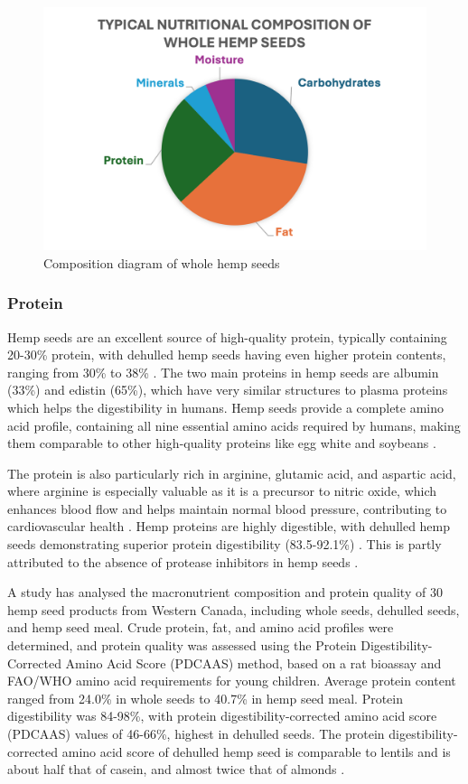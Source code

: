 \begin{figure}[H]
    \centering
    \includegraphics[width=0.73\linewidth]{Figures/fig_prod_concept_02.png}
    \caption{Composition diagram of whole hemp seeds}
    \label{fig:figure_05}
\end{figure}

\subsubsection{Protein}
Hemp seeds are an excellent source of high-quality protein, typically containing 20-30\% protein, with dehulled hemp seeds having even higher protein contents, ranging from 30\% to 38\% \cite*{HempBook}. The two main proteins in hemp seeds are albumin (33\%) and edistin (65\%), which have very similar structures to plasma proteins which helps the digestibility in humans. Hemp seeds provide a complete amino acid profile, containing all nine essential amino acids required by humans, making them comparable to other high-quality proteins like egg white and soybeans \cite*{HempBook}.

\vspace{1em}
The protein is also particularly rich in arginine, glutamic acid, and aspartic acid, where arginine is especially valuable as it is a precursor to nitric oxide, which enhances blood flow and helps maintain normal blood pressure, contributing to cardiovascular health \cite*{HempBook}.
Hemp proteins are highly digestible, with dehulled hemp seeds demonstrating superior protein digestibility (83.5-92.1\%) \cite*{montero2023hemp}. This is partly attributed to the absence of protease inhibitors in hemp seeds \cite*{aluko2017hemp}. 

\vspace{1em}
A study has analysed the macronutrient composition and protein quality of 30 hemp seed products from Western Canada, including whole seeds, dehulled seeds, and hemp seed meal. Crude protein, fat, and amino acid profiles were determined, and protein quality was assessed using the Protein Digestibility-Corrected Amino Acid Score (PDCAAS) method, based on a rat bioassay and FAO/WHO amino acid requirements for young children. Average protein content ranged from 24.0\% in whole seeds to 40.7\% in hemp seed meal. Protein digestibility was 84-98\%, with protein digestibility-corrected amino acid score (PDCAAS) values of 46-66\%, highest in dehulled seeds. The protein digestibility-corrected amino acid score of dehulled hemp seed is comparable to lentils and is about half that of casein, and almost twice that of almonds \cite*{HempBook}.

